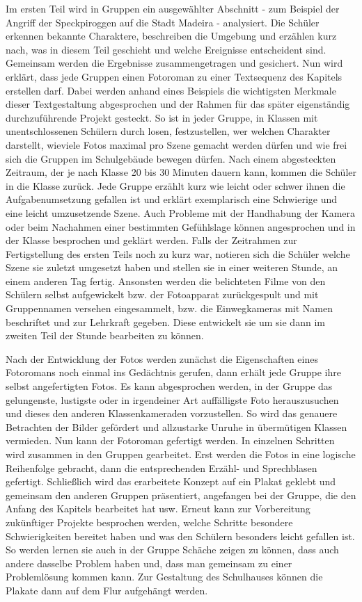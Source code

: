 Im ersten Teil wird in Gruppen ein ausgewählter Abschnitt - zum Beispiel der Angriff der Speckpiroggen auf die Stadt Madeira \cite[180ff]{pir} - analysiert. Die Schüler erkennen bekannte Charaktere, beschreiben die Umgebung und erzählen kurz nach, was in diesem Teil geschieht und welche Ereignisse entscheident sind. Gemeinsam werden die Ergebnisse zusammengetragen und gesichert.  Nun wird erklärt, dass jede Gruppen einen Fotoroman zu einer Textsequenz des Kapitels erstellen darf. Dabei werden anhand eines Beispiels die wichtigsten Merkmale dieser Textgestaltung abgesprochen und der Rahmen für das später eigenständig durchzuführende Projekt gesteckt. So ist in jeder Gruppe, in Klassen mit unentschlossenen Schülern durch losen, festzustellen, wer welchen Charakter darstellt, wieviele Fotos maximal pro Szene gemacht werden dürfen und wie frei sich die Gruppen im Schulgebäude bewegen dürfen. Nach einem abgesteckten Zeitraum, der je nach Klasse 20 bis 30 Minuten dauern kann, kommen die Schüler in die Klasse zurück. Jede Gruppe erzählt kurz wie leicht oder schwer ihnen die Aufgabenumsetzung gefallen ist und erklärt exemplarisch eine Schwierige und eine leicht umzusetzende Szene. Auch Probleme mit der Handhabung der Kamera oder beim Nachahmen einer bestimmten Gefühlslage können angesprochen und in der Klasse besprochen und geklärt werden. Falls der Zeitrahmen zur Fertigstellung des ersten Teils noch zu kurz war, notieren sich die Schüler welche Szene sie zuletzt umgesetzt haben und stellen sie in einer weiteren Stunde, an einem anderen Tag fertig. Ansonsten werden die belichteten Filme von den Schülern selbst aufgewickelt bzw. der Fotoapparat zurückgespult und mit Gruppennamen versehen eingesammelt, bzw. die Einwegkameras mit Namen beschriftet und zur Lehrkraft gegeben. Diese entwickelt sie um sie dann im zweiten Teil der Stunde bearbeiten zu können.

Nach der Entwicklung der Fotos werden zunächst die Eigenschaften eines Fotoromans noch einmal ins Gedächtnis gerufen, dann erhält jede Gruppe ihre selbst angefertigten Fotos. Es kann abgesprochen werden, in der Gruppe das gelungenste, lustigste oder in irgendeiner Art auffälligste Foto herauszusuchen und dieses den anderen Klassenkameraden vorzustellen. So wird das genauere Betrachten der Bilder gefördert und allzustarke Unruhe in übermütigen Klassen vermieden. Nun kann der Fotoroman gefertigt werden. In einzelnen Schritten wird zusammen in den Gruppen gearbeitet. Erst werden die Fotos in eine logische Reihenfolge gebracht, dann die entsprechenden Erzähl- und Sprechblasen gefertigt. Schließlich wird das erarbeitete Konzept auf ein Plakat geklebt und gemeinsam den anderen Gruppen präsentiert, angefangen bei der Gruppe, die den Anfang des Kapitels bearbeitet hat usw. Erneut kann zur Vorbereitung zukünftiger Projekte besprochen werden, welche Schritte besondere Schwierigkeiten bereitet haben und was den Schülern besonders leicht gefallen ist. So werden lernen sie auch in der Gruppe Schäche zeigen zu können, dass auch andere dasselbe Problem haben und, dass man gemeinsam zu einer Problemlösung kommen kann. Zur Gestaltung des Schulhauses können die Plakate dann auf dem Flur aufgehängt werden.


